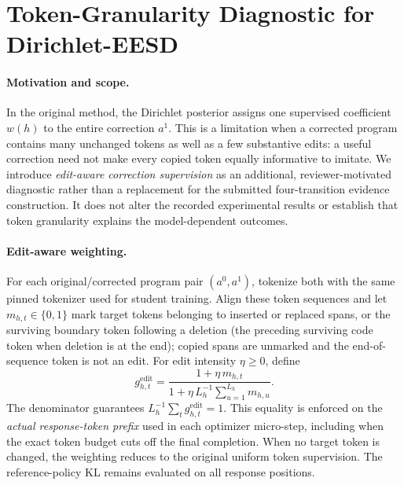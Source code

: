 \section{Token-Granularity Diagnostic for Dirichlet-EESD}
\label{app:token-granularity}

\paragraph{Motivation and scope.}
In the original method, the Dirichlet posterior assigns one supervised
coefficient $w(h)$ to the entire correction $a^1$.
This is a limitation when a corrected program contains many unchanged
tokens as well as a few substantive edits: a useful correction need not
make every copied token equally informative to imitate.
We introduce \emph{edit-aware correction supervision} as an
additional, reviewer-motivated diagnostic rather than a replacement
for the submitted four-transition evidence construction.
It does not alter the recorded experimental results or establish
that token granularity explains the model-dependent outcomes.

\paragraph{Edit-aware weighting.}
For each original/corrected program pair $(a^0,a^1)$, tokenize both
with the same pinned tokenizer used for student training.
Align these token sequences and let $m_{h,t}\in\{0,1\}$ mark
target tokens belonging to inserted or replaced spans, or the
surviving boundary token following a deletion (the preceding surviving
code token when deletion is at the end);
copied spans are unmarked and the end-of-sequence token is not an edit.
For edit intensity $\eta\ge 0$, define
\begin{equation}
g_{h,t}^{\mathrm{edit}}
=\frac{1+\eta\,m_{h,t}}{1+\eta\,L_h^{-1}\sum_{u=1}^{L_h}m_{h,u}}.
\label{eq:token-aware-gain}
\end{equation}
The denominator guarantees $L_h^{-1}\sum_t g_{h,t}^{\mathrm{edit}}=1$.
This equality is enforced on the \emph{actual response-token prefix}
used in each optimizer micro-step, including when the exact
token budget cuts off the final completion.
When no target token is changed, the weighting reduces to
the original uniform token supervision.
The reference-policy KL remains evaluated on all response positions.

